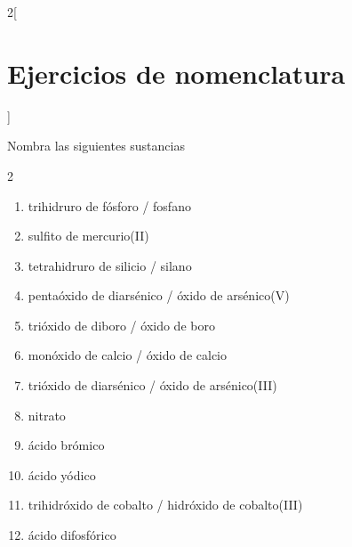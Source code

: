 \documentclass[10pt]{article}
\begin{document}
\begin{multicols*}{2}[
  \section{Ejercicios de nomenclatura}
  ]
\begin{exercise}[
    tags    = {inorgánica,nomenclatura,múltiple,2B},
    topics  = {química inorgánica,formulación,nomenclatura},
    source  = {Química 2B SAN 2016, p372, e8},
  ]
  Nombra las siguientes sustancias

  \begin{enumerate}\begin{multicols}{2}
    \item {}
    \item {}
    \item {}
    \item {}
    \item {}
    \item {}
    \item {}
    \item {}
    \item {}
    \item {}
    \item {}
    \item {}
  \end{multicols}\end{enumerate}
\end{exercise}

\begin{solution}
  \begin{enumerate}
    \item trihidruro de fósforo / fosfano
    \item sulfito de mercurio(II)
    \item tetrahidruro de silicio / silano
    \item pentaóxido de diarsénico / óxido de arsénico(V)
    \item trióxido de diboro / óxido de boro
    \item monóxido de calcio / óxido de calcio
    \item trióxido de diarsénico / óxido de arsénico(III)
    \item nitrato
    \item ácido brómico
    \item ácido yódico
    \item trihidróxido de cobalto / hidróxido de cobalto(III)
    \item ácido difosfórico
  \end{enumerate}
\end{solution}





\end{multicols*}
\end{document}
